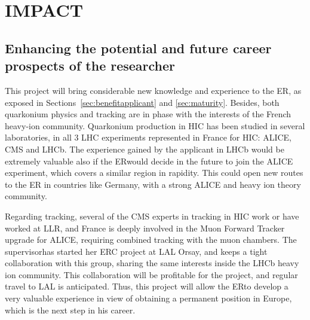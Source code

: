\documentclass[a4paper,11pt]{article}
\newcommand{\ER}{ER}
\newcommand{\Supervisor}{The supervisor}
\begin{document}
%           

\section{IMPACT}
\label{sec:impact}

%               

\subsection{Enhancing the potential and future career prospects of the researcher }
\label{sec:enhancement}

This project will bring considerable new knowledge and experience to the \ER, as exposed in Sections~\ref{sec:benefitapplicant} and \ref{sec:maturity}. Besides, both quarkonium physics and tracking are in phase with the interests of the French heavy-ion community. Quarkonium production in HIC has been studied in several laboratories, in all 3 LHC experiments represented in France for HIC: ALICE, CMS and LHCb. 
The experience gained by the applicant in LHCb would be extremely valuable
also if the \ER would decide in the future to join the ALICE experiment, which 
covers a similar region in rapidity. This could open new routes to the \ER 
in countries like Germany, with a strong ALICE and heavy ion theory community.

Regarding tracking, several of the CMS experts in tracking in HIC work or have worked at LLR, and France is deeply involved in the Muon Forward Tracker upgrade for ALICE, requiring combined tracking with the muon chambers. \Supervisor has started her ERC project at LAL Orsay, and keeps a tight collaboration with this group, sharing the same interests inside the LHCb heavy ion community. This collaboration will be profitable for the project, and regular travel to LAL is anticipated. Thus, this project will allow the \ER to develop a very valuable experience in view of obtaining a permanent position in Europe, which is the next step in his career.



%                
\end{document}
